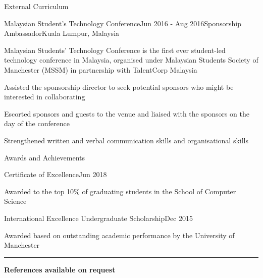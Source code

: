 \documentclass{techresume} %
\begin{document}
\begin{rSection}{External Curriculum}
\begin{rSubsection}{Malaysian Student's Technology Conference}{Jun 2016 - Aug 2016}{Sponsorship Ambassador}{Kuala Lumpur, Malaysia}
\item Malaysian Students’ Technology Conference is the first ever student-led technology conference in Malaysia, organised under Malaysian Students Society of Manchester (MSSM) in partnership with TalentCorp Malaysia
\item Assisted the sponsorship director to seek potential sponsors who might be interested in collaborating
\item Escorted sponsors and guests to the venue and liaised with the sponsors on the day of the conference
\item Strengthened written and verbal communication skills and organisational skills
\end{rSubsection}

\end{rSection}


\begin{rSection}{Awards and Achievements}

\begin{rSubsection}{Certificate of Excellence}{Jun 2018}{}{}
\item[] Awarded to the top 10\% of graduating students in the School of Computer Science
\end{rSubsection}

\begin{rSubsection}{International Excellence Undergraduate Scholarship}{Dec 2015}{}{}
\item[] Awarded based on outstanding academic performance by the University of Manchester
\end{rSubsection}

\end{rSection}


\sectionskip
\sectionlineskip
\hrule
{\bf References available on request}
\end{document}
